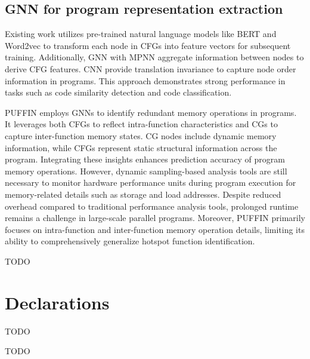\documentclass[lineno,sn-mathphys]{sn-jnl}%
\theoremstyle{thmstyleone}%
\theoremstyle{thmstyletwo}%
\theoremstyle{thmstylethree}%
\begin{document}
 \subsection{GNN for program representation extraction}
 Existing work utilizes pre-trained natural language models like BERT and Word2vec to transform each node in CFGs into feature vectors for subsequent training. Additionally, GNN with MPNN aggregate information between nodes to derive CFG features. CNN provide translation invariance to capture node order information in programs. This approach demonstrates strong performance in tasks such as code similarity detection and code classification.\par 
 PUFFIN employs GNNs to identify redundant memory operations in programs. It leverages both CFGs to reflect intra-function characteristics and CGs to capture inter-function memory states. CG nodes include dynamic memory information, while CFGs represent static structural information across the program. Integrating these insights enhances prediction accuracy of program memory operations. However, dynamic sampling-based analysis tools are still necessary to monitor hardware performance units during program execution for memory-related details such as storage and load addresses. Despite reduced overhead compared to traditional performance analysis tools, prolonged runtime remains a challenge in large-scale parallel programs. Moreover, PUFFIN primarily focuses on intra-function and inter-function memory operation details, limiting its ability to comprehensively generalize hotspot function identification.


 \backmatter

  TODO
   
 \section*{Declarations}
   TODO


TODO

\end{document}
